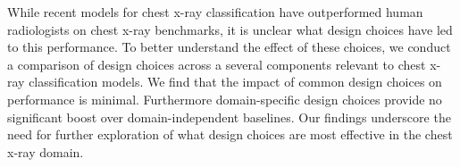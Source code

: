 While recent models for chest x-ray classification have outperformed human radiologists on chest x-ray benchmarks, it is unclear what design choices have led to this performance. To better understand the effect of these choices, we conduct a comparison of design choices across a several components relevant to chest x-ray classification models. We find that the impact of common design choices on performance is minimal. Furthermore domain-specific design choices provide no significant boost over domain-independent baselines. Our findings underscore the need for further exploration of what design choices are most effective in the chest x-ray domain.
